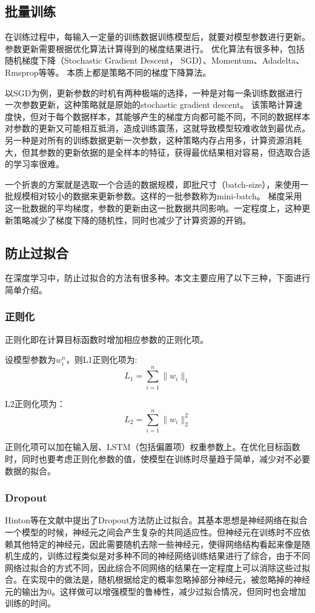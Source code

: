 \subsection{批量训练}
在训练过程中，每输入一定量的训练数据训练模型后，就要对模型参数进行更新。
参数更新需要根据优化算法计算得到的梯度结果进行。
优化算法有很多种，包括随机梯度下降（Stochastic Gradient Descent， SGD）、Momentum、Adadelta、Rmsprop等等。
本质上都是策略不同的梯度下降算法。

以SGD为例，更新参数的时机有两种极端的选择，一种是对每一条训练数据进行一次参数更新，这种策略就是原始的stochastic gradient descent。
该策略计算速度快，但对于每个数据样本，其能够产生的梯度方向都可能不同，不同的数据样本对参数的更新又可能相互抵消，造成训练震荡，这就导致模型较难收敛到最优点。
另一种是对所有的训练数据更新一次参数，这种策略内存占用多，计算资源消耗大，但其参数的更新依据的是全样本的特征，获得最优结果相对容易，但选取合适的学习率很难。

一个折衷的方案就是选取一个合适的数据规模，即批尺寸（batch-size），来使用一批规模相对较小的数据来更新参数。这样的一批参数称为mini-batch。
梯度采用这一批数据的平均梯度，参数的更新由这一批数据共同影响。一定程度上，这种更新策略减少了梯度下降的随机性，同时也减少了计算资源的开销。
\subsection{防止过拟合}
在深度学习中，防止过拟合的方法有很多种。本文主要应用了以下三种，下面进行简单介绍。
\subsubsection{正则化}
正则化即在计算目标函数时增加相应参数的正则化项。

设模型参数为$w_i^n$，则L1正则化项为:
\begin{equation}
    L_1 = \sum^n_{i=1}\lVert w_i \rVert_1
\end{equation}

L2正则化项为：
\begin{equation}
    L_2 = \sum^n_{i=1}\lVert w_i \rVert_2^2
\end{equation}

正则化项可以加在输入层、LSTM（包括偏置项）权重参数上。在优化目标函数时，同时也要考虑正则化参数的值，使模型在训练时尽量趋于简单，减少对不必要数据的拟合。
\subsubsection{Dropout}
Hinton等在文献中提出了Dropout方法防止过拟合。其基本思想是神经网络在拟合一个模型的时候，神经元之间会产生复杂的共同适应性。但神经元在训练时不应依赖其他特定的神经元，因此需要随机去除一些神经元，使得网络结构看起来像是随机生成的，训练过程类似是对多种不同的神经网络训练结果进行了综合，由于不同网络过拟合的方式不同，因此综合不同网络的结果在一定程度上可以消除这些过拟合。在实现中的做法是，随机根据给定的概率忽略掉部分神经元，被忽略掉的神经元的输出为0。这样做可以增强模型的鲁棒性，减少过拟合情况，但同时也会增加训练的时间。

